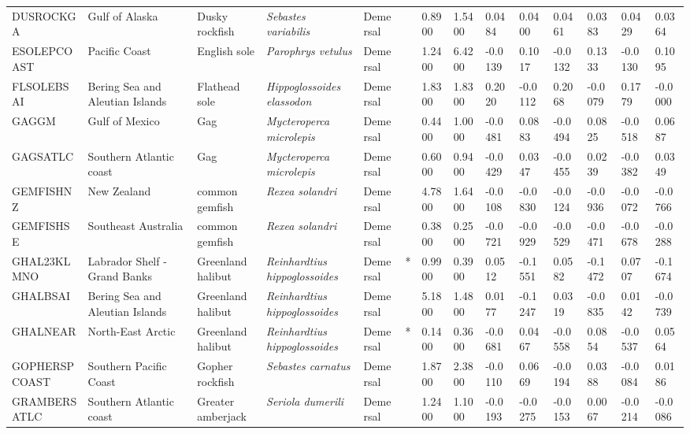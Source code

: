 \begin{longtable}{p{2.6cm}p{1.9cm}p{1.7cm}p{1.6cm}p{1cm}p{0.3cm}p{1cm}p{1cm}p{1cm}p{1.1cm}p{1cm}p{1.1cm}p{1cm}p{1.1cm}}
  DUSROCKGA & Gulf of Alaska & Dusky rockfish & \textit{Sebastes variabilis} & Demersal &   & 0.8900 & 1.5400 & 0.0484 & 0.0400 & 0.0461 & 0.0383 & 0.0429 & 0.0364 \\ 
  ESOLEPCOAST & Pacific Coast & English sole & \textit{Parophrys vetulus} & Demersal &   & 1.2400 & 6.4200 & -0.0139 & 0.1017 & -0.0132 & 0.1333 & -0.0130 & 0.1095 \\ 
  FLSOLEBSAI & Bering Sea and Aleutian Islands & Flathead sole & \textit{Hippoglossoides elassodon} & Demersal &   & 1.8300 & 1.8300 & 0.2020 & -0.0112 & 0.2068 & -0.0079 & 0.1779 & -0.0000 \\ 
  GAGGM & Gulf of Mexico & Gag & \textit{Mycteroperca microlepis} & Demersal &   & 0.4400 & 1.0000 & -0.0481 & 0.0883 & -0.0494 & 0.0825 & -0.0518 & 0.0687 \\ 
  GAGSATLC & Southern Atlantic coast & Gag & \textit{Mycteroperca microlepis} & Demersal &   & 0.6000 & 0.9400 & -0.0429 & 0.0347 & -0.0455 & 0.0239 & -0.0382 & 0.0349 \\ 
  GEMFISHNZ & New Zealand & common gemfish & \textit{Rexea solandri} & Demersal &   & 4.7800 & 1.6400 & -0.0108 & -0.0830 & -0.0124 & -0.0936 & -0.0072 & -0.0766 \\ 
  GEMFISHSE & Southeast Australia & common gemfish & \textit{Rexea solandri} & Demersal &   & 0.3800 & 0.2500 & -0.0721 & -0.0929 & -0.0529 & -0.0471 & -0.0678 & -0.0288 \\ 
  GHAL23KLMNO & Labrador Shelf - Grand Banks & Greenland halibut & \textit{Reinhardtius hippoglossoides} & Demersal & * & 0.9900 & 0.3900 & 0.0512 & -0.1551 & 0.0582 & -0.1472 & 0.0707 & -0.1674 \\ 
  GHALBSAI & Bering Sea and Aleutian Islands & Greenland halibut & \textit{Reinhardtius hippoglossoides} & Demersal &   & 5.1800 & 1.4800 & 0.0177 & -0.1247 & 0.0319 & -0.0835 & 0.0142 & -0.0739 \\ 
  GHALNEAR & North-East Arctic & Greenland halibut & \textit{Reinhardtius hippoglossoides} & Demersal & * & 0.1400 & 0.3600 & -0.0681 & 0.0467 & -0.0558 & 0.0854 & -0.0537 & 0.0564 \\ 
  GOPHERSPCOAST & Southern Pacific Coast & Gopher rockfish & \textit{Sebastes carnatus} & Demersal &   & 1.8700 & 2.3800 & -0.0110 & 0.0669 & -0.0194 & 0.0388 & -0.0084 & 0.0186 \\ 
  GRAMBERSATLC & Southern Atlantic coast & Greater amberjack & \textit{Seriola dumerili} & Demersal &   & 1.2400 & 1.1000 & -0.0193 & -0.0275 & -0.0153 & 0.0067 & -0.0214 & -0.0086 \\ 

\end{longtable}

